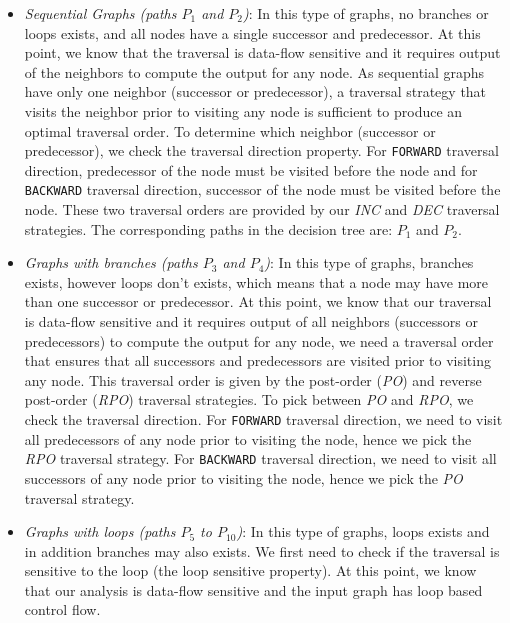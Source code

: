 \begin{itemize}
  \item \textit{Sequential Graphs (paths $P_1$ and $P_2$)}:
  In this type of graphs, no branches or loops exists, and all nodes have
  a single successor and predecessor.
  At this point, we know that the traversal is data-flow sensitive and it
  requires output of the neighbors to compute the output for any node. As
  sequential graphs have only one neighbor (successor or predecessor), a
  traversal strategy that visits the neighbor prior to visiting any node is
  sufficient to produce an optimal traversal order. To determine which neighbor
  (successor or predecessor), we check the traversal direction property. For
  \lstinline|FORWARD| traversal direction, predecessor of the node must be
  visited before the node and for \lstinline|BACKWARD| traversal direction,
  successor of the node must be visited before the node. These two traversal
  orders are provided by our \textit{INC} and \textit{DEC} traversal
  strategies. The corresponding paths in the decision tree are: $P_1$ and $P_2$.
  \item \textit{Graphs with branches (paths $P_3$ and $P_4$)}:
  In this type of graphs, branches exists, however loops don't exists, which
  means that a node may have more than one successor or predecessor. At this
  point, we know that our traversal is data-flow sensitive and it requires
  output of all neighbors (successors or predecessors) to compute the output for
  any node, we need a traversal order that ensures that all successors and
  predecessors are visited prior to visiting any node. This traversal order is
  given by the post-order (\textit{PO}) and reverse post-order (\textit{RPO})
  traversal strategies. To pick between \textit{PO} and \textit{RPO}, we check
  the traversal direction.
  For \lstinline|FORWARD| traversal direction, we need to visit all predecessors
  of any node prior to visiting the node, hence we pick the \textit{RPO}
  traversal strategy. For \lstinline|BACKWARD| traversal direction, we need to
  visit all successors of any node prior to visiting the node, hence we pick the
  \textit{PO} traversal strategy.
  \item \textit{Graphs with loops (paths $P_5$ to $P_{10}$)}: In this type of
  graphs, loops exists and in addition branches may also exists. We first need
  to check if the traversal is sensitive to the loop (the loop sensitive
  property). At this point, we know that our analysis is data-flow sensitive and
  the input graph has loop based control flow.
  	\begin{itemize}

\end{itemize}
\end{itemize}
